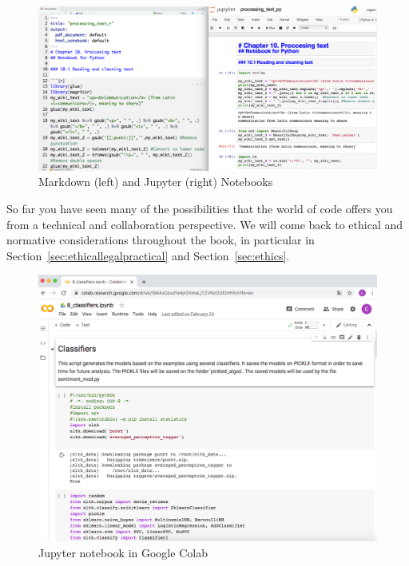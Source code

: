\begin{figure}
\centering
\includegraphics[width=0.9\linewidth]{figures/ch04_notebooks.png}
\caption{Markdown (left) and Jupyter (right) Notebooks}
\label{fig:notebooks}
\end{figure}

So far you have seen many of the possibilities that the world of code offers you from a technical and collaboration perspective. We will come back to ethical and normative considerations throughout the book, in particular in Section~\ref{sec:ethicallegalpractical} and Section~\ref{sec:ethics}.

\begin{figure}
\centering
\includegraphics[width=0.9\linewidth]{figures/ch04_colab.png}
\caption{Jupyter notebook in Google Colab}
\label{fig:colab}
\end{figure}

